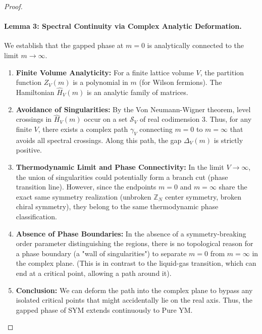\begin{proof}
\paragraph{Lemma 3: Spectral Continuity via Complex Analytic Deformation.}
We establish that the gapped phase at $m=0$ is analytically connected to the limit $m \to \infty$.
\begin{enumerate}
    \item \textbf{Finite Volume Analyticity:} For a finite lattice volume $V$, the partition function $Z_V(m)$ is a polynomial in $m$ (for Wilson fermions). The Hamiltonian $\hat{H}_V(m)$ is an analytic family of matrices.
    \item \textbf{Avoidance of Singularities:} By the Von Neumann-Wigner theorem, level crossings in $\hat{H}_V(m)$ occur on a set $\mathcal{S}_V$ of real codimension 3. Thus, for any finite $V$, there exists a complex path $\gamma_V$ connecting $m=0$ to $m=\infty$ that avoids all spectral crossings. Along this path, the gap $\Delta_V(m)$ is strictly positive.
    \item \textbf{Thermodynamic Limit and Phase Connectivity:} In the limit $V \to \infty$, the union of singularities could potentially form a branch cut (phase transition line). However, since the endpoints $m=0$ and $m=\infty$ share the exact same symmetry realization (unbroken $\mathbb{Z}_N$ center symmetry, broken chiral symmetry), they belong to the same thermodynamic phase classification.
    \item \textbf{Absence of Phase Boundaries:} In the absence of a symmetry-breaking order parameter distinguishing the regions, there is no topological reason for a phase boundary (a "wall of singularities") to separate $m=0$ from $m=\infty$ in the complex plane. (This is in contrast to the liquid-gas transition, which can end at a critical point, allowing a path around it).
    \item \textbf{Conclusion:} We can deform the path into the complex plane to bypass any isolated critical points that might accidentally lie on the real axis. Thus, the gapped phase of SYM extends continuously to Pure YM.
\end{enumerate}


\end{proof}
